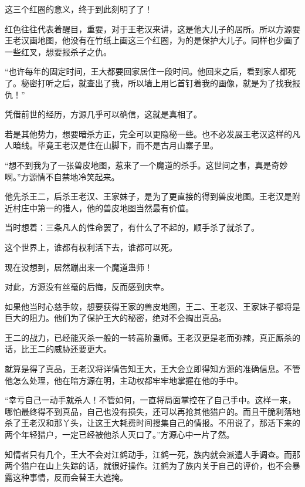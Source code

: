 \begin{this_body}
这三个红圈的意义，终于到此刻明了了！

红色往往代表着醒目，重要，对于王老汉来讲，这是他大儿子的居所。所以方源要王老汉画地图，他没有在竹纸上画这三个红圈，为的是保护大儿子。同样也少画了一些红叉，想要报杀子之仇。

“也许每年的固定时间，王大都要回家居住一段时间。他回来之后，看到家人都死了。秘密打听之后，就查出了我，所以墙上用匕首钉着我的画像，就是为了找我报仇！”

凭借前世的经历，方源几乎可以确信，这就是真相了。

若是其他势力，想要暗杀方正，完全可以更隐秘一些。也不必发展王老汉这样的凡人暗线。毕竟王老汉是住在山脚下，而不是古月山寨子里。

“想不到我为了一张兽皮地图，惹来了一个魔道的杀手。这世间之事，真是奇妙啊。”方源情不自禁地冷笑起来。

他先杀王二，后杀王老汉、王家妹子，是为了更直接的得到兽皮地图。王老汉是附近村庄中第一的猎人，他的兽皮地图当然最有价值。

当时想着：三条凡人的性命罢了，有什么了不起的，顺手杀了就杀了。

这个世界上，谁都有权利活下去，谁都可以死。

现在没想到，居然蹦出来一个魔道蛊师！

对此，方源没有丝毫的后悔，反而感到庆幸。

如果他当时心慈手软，想要获得王家的兽皮地图，王二、王老汉、王家妹子都将是巨大的阻力。他们为了保护王大的秘密，绝对不会掏出真品。

王二的战力，已经能灭杀一般的一转高阶蛊师。王老汉更是老而弥辣，真正厮杀的话，比王二的威胁还要更大。

就算是得了真品，王老汉将详情告知王大，王大会立即得知方源的准确信息。不管他怎么处理，他在暗方源在明，主动权都牢牢地掌握在他的手中。

“幸亏自己一动手就杀人！不管如何，一直将局面掌控在了自己手中。这样一来，哪怕最终得不到真品，自己也没有损失，还可以再抢其他猎户的。而且干脆利落地杀了王老汉和那丫头，让这王大耗费时间搜集自己的情报。不用说了，那活下来的两个年轻猎户，一定已经被他杀人灭口了。”方源心中一片了然。

知情者只有几个，王大不会对江鹤动手，江鹤一死，族内就会派遣人手调查。而那两个猎户在山上失踪的话，就很好操作。江鹤为了族内关于自己的评价，也不会暴露这种事情，反而会替王大遮掩。

\end{this_body}

